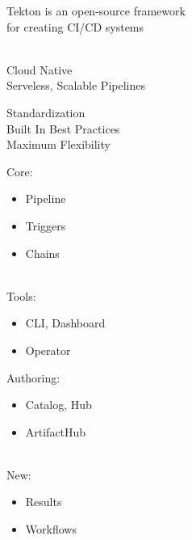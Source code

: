 \documentclass[aspectratio=169,11pt,hyperref={colorlinks=true}]{beamer}
\begin{document}
\begin{stripedframe}%
  {%
  Tekton is an open-source framework \\ for creating CI/CD systems \\ ~
  }%
  {%
  Cloud Native \\
  \vspace{0.03\textheight}
  Serveless, Scalable Pipelines \\
  \vspace{0.1\textheight}
  \centering
  
  }%
  {%
  Standardization \\
  \vspace{0.03\textheight}
  Built In Best Practices \\
  \vspace{0.03\textheight}
  Maximum Flexibility \\
  }%
  {%
  \vspace{0.01\textheight}
  Core:
  \begin{itemize}
    \item Pipeline
    \item Triggers
    \item Chains
  \end{itemize}
  ~ \\
  Tools:
  \begin{itemize}
    \item CLI, Dashboard
    \item Operator
  \end{itemize}
  }%
  {%
  Authoring:
  \begin{itemize}
    \item Catalog, Hub
    \item ArtifactHub
  \end{itemize}
  ~ \\
  New:
  \begin{itemize}
    \item Results
    \item Workflows
  \end{itemize}
  }%
\end{stripedframe}
\end{document}
